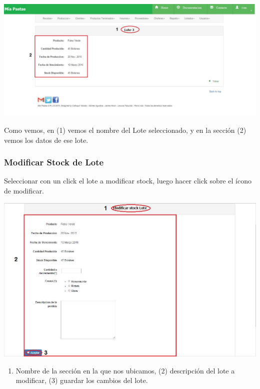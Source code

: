 \documentclass[letterpaper,10pt,english]{sphinxmanual}
\begin{document}
\includegraphics{lotes_detalle.jpg}

Como vemos, en (1) vemos el nombre del Lote seleccionado, y en la sección (2) vemos los datos de ese lote.


\subsubsection{Modificar Stock de Lote}
\label{lotes:modificar-stock-de-lote}
Seleccionar con un click el lote a modificar stock, luego hacer click sobre el ícono de modificar.

\includegraphics{lotes_modificar.jpg}
\begin{enumerate}
\item {} 
Nombre de la sección en la que nos ubicamos, (2) descripción del lote a modificar, (3) guardar los cambios del lote.

\end{enumerate}
\end{document}
